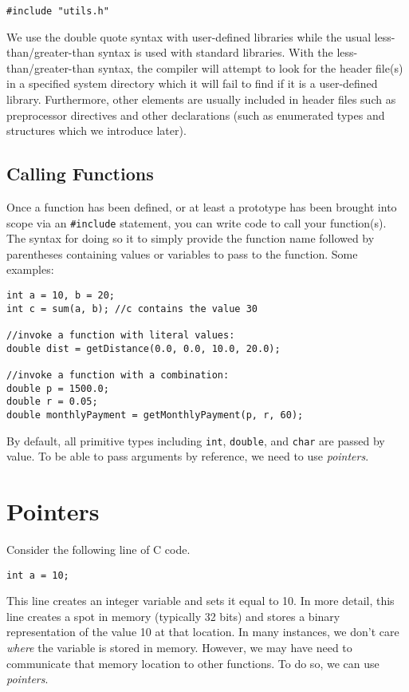 \texttt{#include "utils.h"}

We use the double quote syntax with user-defined libraries while the
usual less-than/greater-than syntax is used with standard libraries.
With the less-than/greater-than syntax, the compiler will  
attempt to look for the header file(s) in a specified system directory
which it will fail to find if it is a user-defined library.
Furthermore, other elements are usually included in header files
such as preprocessor directives and other declarations (such as
enumerated types and structures which we introduce later).

\subsection{Calling Functions}

Once a function has been defined, or at least a prototype has
been brought into scope via an \texttt{#include} statement, 
you can write code to call your function(s).  The syntax for
doing so it to simply provide the function name followed by 
parentheses containing values or variables to pass to the function.
Some examples:

\begin{verbatim}
int a = 10, b = 20;
int c = sum(a, b); //c contains the value 30

//invoke a function with literal values:
double dist = getDistance(0.0, 0.0, 10.0, 20.0);

//invoke a function with a combination:
double p = 1500.0;
double r = 0.05;
double monthlyPayment = getMonthlyPayment(p, r, 60);
\end{verbatim}

By default, all primitive types including \texttt{int}, 
\texttt{double}, and \texttt{char} are passed by 
value.  To be able to pass arguments by reference, we need to use
\emph{pointers}.

\section{Pointers}
\label{section:cPointers}

Consider the following line of C code.

\texttt{int a = 10;}

This line creates an integer variable and sets it equal to 10.  In
more detail, this line creates a spot in memory (typically 32 bits)
and stores a binary representation of the value 10 at that location.
In many instances, we don't care \emph{where} the variable
is stored in memory.  However, we may have need to communicate
that memory location to other functions.  To do so, we can use 
\emph{pointers}.


